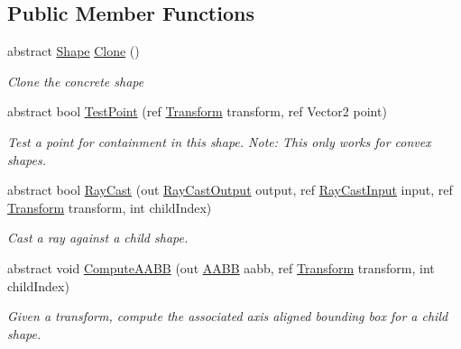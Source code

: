 \subsection*{Public Member Functions}
\begin{DoxyCompactItemize}
\item 
abstract \hyperlink{class_farseer_physics_1_1_collision_1_1_shapes_1_1_shape}{Shape} \hyperlink{class_farseer_physics_1_1_collision_1_1_shapes_1_1_shape_a2ed8c71b5d46dd12f11c6849bbc97249}{Clone} ()
\begin{DoxyCompactList}\small\item\em Clone the concrete shape \end{DoxyCompactList}\item 
abstract bool \hyperlink{class_farseer_physics_1_1_collision_1_1_shapes_1_1_shape_a2b93a18850e5f40fcc96f2f7744d5d2e}{Test\+Point} (ref \hyperlink{struct_farseer_physics_1_1_common_1_1_transform}{Transform} transform, ref Vector2 point)
\begin{DoxyCompactList}\small\item\em Test a point for containment in this shape. Note\+: This only works for convex shapes. \end{DoxyCompactList}\item 
abstract bool \hyperlink{class_farseer_physics_1_1_collision_1_1_shapes_1_1_shape_aa032bbd2ea521bb5a917e4d860638d3a}{Ray\+Cast} (out \hyperlink{struct_farseer_physics_1_1_collision_1_1_ray_cast_output}{Ray\+Cast\+Output} output, ref \hyperlink{struct_farseer_physics_1_1_collision_1_1_ray_cast_input}{Ray\+Cast\+Input} input, ref \hyperlink{struct_farseer_physics_1_1_common_1_1_transform}{Transform} transform, int child\+Index)
\begin{DoxyCompactList}\small\item\em Cast a ray against a child shape. \end{DoxyCompactList}\item 
abstract void \hyperlink{class_farseer_physics_1_1_collision_1_1_shapes_1_1_shape_a9804a429e96e36a36bdc22f6d06bcc6c}{Compute\+A\+A\+B\+B} (out \hyperlink{struct_farseer_physics_1_1_collision_1_1_a_a_b_b}{A\+A\+B\+B} aabb, ref \hyperlink{struct_farseer_physics_1_1_common_1_1_transform}{Transform} transform, int child\+Index)
\begin{DoxyCompactList}\small\item\em Given a transform, compute the associated axis aligned bounding box for a child shape. \end{DoxyCompactList}\item 

\end{DoxyCompactItemize}
